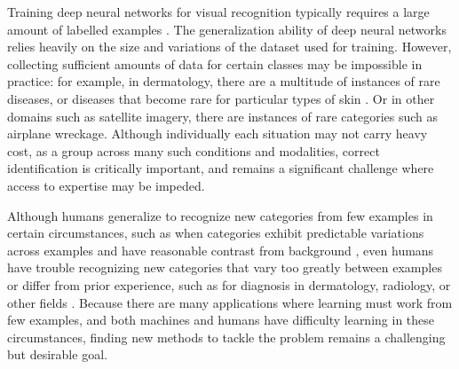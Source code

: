 \documentclass[runningheads]{llncs}
\begin{document}
Training deep neural networks for visual recognition typically requires a large amount of labelled examples \cite{krizhevsky2012imagenet}. The generalization ability of deep neural networks relies heavily on the size and variations of the dataset used for training. However, collecting sufficient amounts of data for certain classes may be impossible in practice: for example, in dermatology, there are a multitude of instances of rare diseases, or diseases that become rare for particular types of skin \cite{rotemberg2019role,adamson2018machine,fairnessinskin}. Or in other domains such as satellite imagery, there are instances of rare categories such as airplane wreckage. Although individually each situation may not carry heavy cost, as a group across many such conditions and modalities, correct identification is critically important, and remains a significant challenge where access to expertise may be impeded.

Although humans generalize to recognize new categories from few examples in certain circumstances, such as when categories exhibit predictable variations across examples and have reasonable contrast from background \cite{lake2015human,lake2011one}, even humans have trouble recognizing new categories that vary too greatly between examples or differ from prior experience, such as for diagnosis in dermatology, radiology, or other fields \cite{rotemberg2019role}. Because there are many applications where learning must work from few examples, and both machines and humans have difficulty learning in these circumstances, finding new methods to tackle the problem remains a challenging but desirable goal. 
\end{document}
